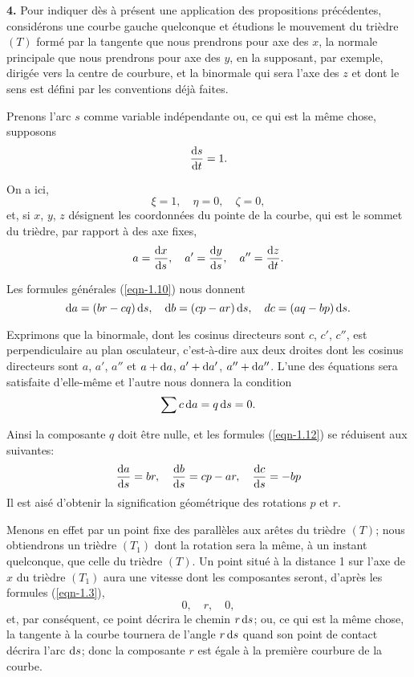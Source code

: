 \textbf{4.} Pour indiquer dès à présent une application des propositions précédentes, considérons une courbe gauche 
quelconque et étudions le mouvement du trièdre $(T)$ formé par la tangente que nous prendrons pour axe des $x$, la 
normale principale que nous prendrons pour axe des $y$, en la supposant, par exemple, dirigée vers la centre de 
courbure, et la binormale qui sera l'axe des $z$ et dont le sens est défini par les conventions déjà faites.

Prenons l'arc $s$ comme variable indépendante ou, ce qui est la même chose, supposons
\[
	\frac{\operatorname{d}\!{s}}{\operatorname{d}\!{t}} = 1.
\]

On a ici,
\[
	\xi = 1, \quad \eta = 0, \quad \zeta = 0,
\]
et, si $x$, $y$, $z$ désignent les coordonnées du pointe de la courbe, qui est le sommet du trièdre, par rapport à des 
axe fixes,
\[
	a = \frac{\operatorname{d}\!{x}}{\operatorname{d}\!{s}}, \quad a' = \frac{\operatorname{d}\!{y}}{\operatorname{d}\!{s}}, \quad a'' = \frac{\operatorname{d}\!{z}}{\operatorname{d}\!{t}}.
\]

Les formules générales (\ref{eqn-1.10}) nous donnent
\begin{equation}
	\operatorname{d}\!{a} = (br - cq)\operatorname{d}\!{s}, \quad \operatorname{d}\!{b} = (cp - ar)\operatorname{d}\!{s}, \quad dc = (aq - bp)\operatorname{d}\!{s}.
	\label{eqn-1.12}
\end{equation}

Exprimons que la binormale, dont les cosinus directeurs sont $c$, $c'$, $c''$, est perpendiculaire au plan osculateur, 
c'est-à-dire aux deux droites dont les cosinus directeurs sont $a$, $a'$, $a''$ et $a + \operatorname{d}\!{a}$, $a' + \operatorname{d}\!{a'}$, $a'' + 
\operatorname{d}\!{a''}$. L'une des équations sera satisfaite d'elle-même et l'autre nous donnera la condition
\[
	\sum{c}\operatorname{d}\!{a} = q \operatorname{d}\!{s} = 0.
\]

Ainsi la composante $q$ doit être nulle, et les formules (\ref{eqn-1.12}) se réduisent aux suivantes:
\begin{equation}
	\frac{\operatorname{d}\!{a}}{\operatorname{d}\!{s}} = br, \quad \frac{\operatorname{d}\!{b}}{\operatorname{d}\!{s}} = cp - ar, \quad \frac{\operatorname{d}\!{c}}{\operatorname{d}\!{s}} = - bp
	\label{eqn-1.13}
\end{equation}
Il est aisé d'obtenir la signification géométrique des rotations $p$ et $r$.

Menons en effet par un point fixe des parallèles aux arêtes du trièdre $(T)$; nous obtiendrons un trièdre $(T_1)$ dont 
la rotation sera la même, à un instant quelconque, que celle du trièdre $(T)$. Un point situé à la distance 1 sur l'axe 
de $x$ du trièdre $(T_1)$ aura une vitesse dont les composantes seront, d'après les formules (\ref{eqn-1.3}),
\[
	0, \quad r, \quad 0,
\]
et, par conséquent, ce point décrira le chemin $r \operatorname{d}\!{s}$; ou, ce qui est la même chose, la tangente à la courbe 
tournera de l'angle $r \operatorname{d}\!{s}$ quand son point de contact décrira l'arc $\operatorname{d}\!{s}$; donc la composante $r$ est égale à la 
première courbure de la courbe.

